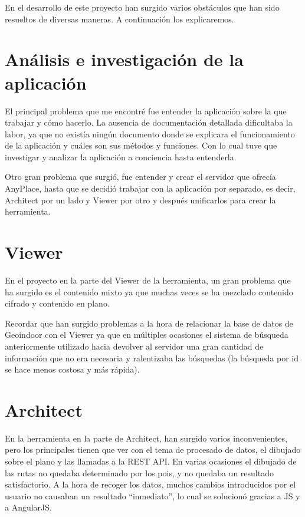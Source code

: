 
En el desarrollo de este proyecto han surgido varios obstáculos que han sido resueltos de diversas maneras. A continuación los explicaremos.

\section{Análisis e investigación de la aplicación }\label{analisis-investigacion}

El principal problema que me encontré fue entender la aplicación sobre la que trabajar y cómo hacerlo. La ausencia de documentación detallada dificultaba la labor, ya que no existía ningún documento donde se explicara el funcionamiento de la aplicación y cuáles son sus métodos y funciones. Con lo cual tuve que investigar y analizar la aplicación a conciencia hasta entenderla.

Otro gran problema que surgió, fue entender y crear el servidor que ofrecía AnyPlace, hasta que se decidió trabajar con la aplicación por separado, es decir, Architect por un lado y Viewer por otro y después unificarlos para crear la herramienta. 

\section{Viewer}\label{viewer}

En el proyecto en la parte del Viewer de la herramienta, un gran problema que ha surgido es el contenido mixto ya que muchas veces se ha mezclado contenido cifrado y contenido en plano.

Recordar que han surgido problemas a la hora de relacionar la base de datos de Geoindoor con el Viewer ya que en múltiples ocasiones el sistema de búsqueda anteriormente utilizado hacia devolver al servidor una gran cantidad de información que no era necesaria y ralentizaba las búsquedas (la búsqueda por id se hace menos costosa y más rápida).

\section{Architect}\label{Architect} 

En la herramienta en la parte de Architect, han surgido varios inconvenientes, pero los principales tienen que ver con el tema de procesado de datos, el dibujado sobre el plano y las llamadas a la REST API. En varias ocasiones el dibujado de las rutas no quedaba determinado por los pois, y no quedaba un resultado satisfactorio. A la hora de recoger los datos, muchos cambios introducidos por el usuario no causaban un resultado ``inmediato'', lo cual se solucionó gracias a JS y a AngularJS.

